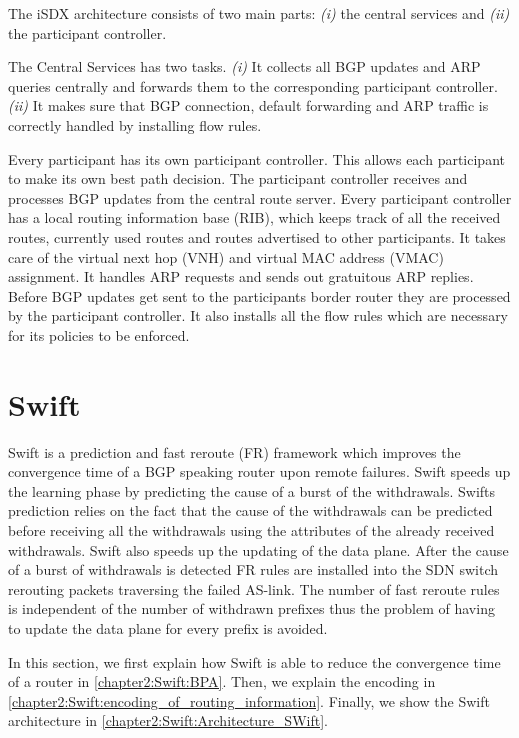 The iSDX architecture consists of two main parts: \emph{(i)} the central services and \emph{(ii)} the participant controller.

The Central Services has two tasks. \emph{(i)} It collects all BGP updates and ARP queries centrally and forwards them to the corresponding participant controller. \emph{(ii)} It makes sure that BGP connection, default forwarding and ARP traffic is correctly handled by installing flow rules.

Every participant has its own participant controller. This allows each participant to make its own best path decision. The participant controller receives and processes BGP updates from the central route server. Every participant controller has a local routing information base (RIB), which keeps track of all the received routes, currently used routes and routes advertised to other participants. It takes care of the virtual next hop (VNH) and virtual MAC address (VMAC) assignment. It handles ARP requests and sends out gratuitous ARP replies. Before BGP updates get sent to the participants border router they are processed by the participant controller. It also installs all the flow rules which are necessary for its policies to be enforced.

\newpage

\section{\label{chapter2:Swift}Swift}

Swift is a prediction and fast reroute (FR) framework which improves the convergence time of a BGP speaking router upon remote failures. Swift speeds up the learning phase by predicting the cause of a burst of the withdrawals. Swifts prediction relies on the fact that the cause of the withdrawals can be predicted before receiving all the withdrawals using the attributes of the already received withdrawals. Swift also speeds up the updating of the data plane. After the cause of a burst of withdrawals is detected FR rules are installed into the SDN switch rerouting packets traversing the failed AS-link. The number of fast reroute rules is independent of the number of withdrawn prefixes thus the problem of having to update the data plane for every prefix is avoided. 

In this section, we first explain how Swift is able to reduce the convergence time of a router in \ref{chapter2:Swift:BPA}. Then, we explain the encoding in \ref{chapter2:Swift:encoding_of_routing_information}. Finally, we show the Swift architecture in \ref{chapter2:Swift:Architecture_SWift}.

